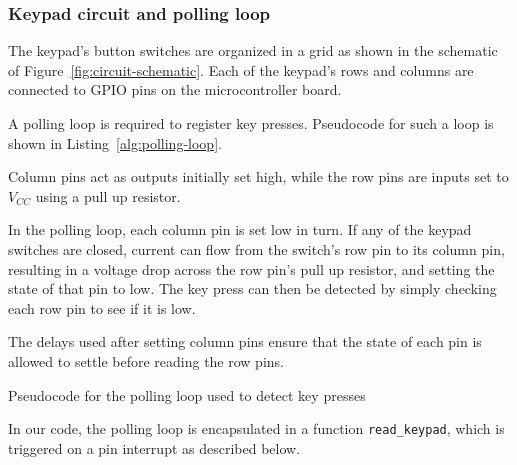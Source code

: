 \documentclass[11pt,a4paper,twocolumn]{scrartcl}
\begin{document}
\subsubsection{Keypad circuit and polling loop}

The keypad's button switches are organized in a grid as shown in the schematic of Figure~\ref{fig:circuit-schematic}. Each of the keypad's rows and columns are connected to GPIO pins on the microcontroller board.

A polling loop is required to register key presses. Pseudocode for such a loop is shown in Listing~\ref{alg:polling-loop}. 

Column pins act as outputs initially set high, while the row pins are inputs set to $V_{CC}$ using a pull up resistor. 

In the polling loop, each column pin is set low in turn. If any of the keypad switches are closed, current can flow from the switch's row pin to its column pin, resulting in a voltage drop across the row pin's pull up resistor, and setting the state of that pin to low. The key press can then be detected by simply checking each row pin to see if it is low. 

The delays used after setting column pins ensure that the state of each pin is allowed to settle before reading the row pins.

\begin{algorithm}
   \caption{Pseudocode for the polling loop used to detect key presses}\label{alg:polling-loop}
\end{algorithm}

In our code, the polling loop is encapsulated in a function \verb!read_keypad!, which is triggered on a pin interrupt as described below. 
\end{document}
